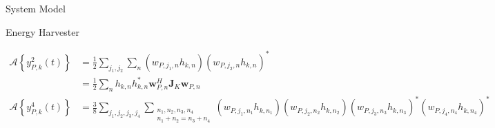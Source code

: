 \documentclass{IEEEtran}
\begin{document}
\begin{section}{System Model}
\begin{subsection}{Energy Harvester}
\begin{figure*}[b]
\begin{align}
				\mathcal{A}\left\{y_{P,k}^2(t)\right\}
				 & =\frac{1}{2}\sum_{j_1,j_2}\sum_n{(w_{P,j_1,n}h_{k,n})(w_{P,j_2,n}h_{k,n})^*}                                                                                                                                                                                                   \\
				 & =\frac{1}{2}\sum_n{h_{k,n}h_{k,n}^*{\boldsymbol{w}_{P,n}^H}{\boldsymbol{J}_{K}}{\boldsymbol{w}_{P,n}}}                                                                                                                                                                         \\
				\mathcal{A}\left\{y_{P,k}^4(t)\right\}
				 & =\frac{3}{8}\sum_{j_1,j_2,j_3,j_4}\sum_{\substack{{n_1},{n_2},{n_3},{n_4}\\{n_1}+{n_2}={n_3}+{n_4}}}{(w_{P,{j_1},{n_1}}h_{k,{n_1}})(w_{P,{j_2},{n_2}}h_{k,{n_2}})(w_{P,{j_3},{n_3}}h_{k,{n_3}})^*(w_{P,{j_4},{n_4}}h_{k,{n_4}})^*}                       \\

\end{align}
\end{figure*}
\end{subsection}
\end{section}
\end{document}
